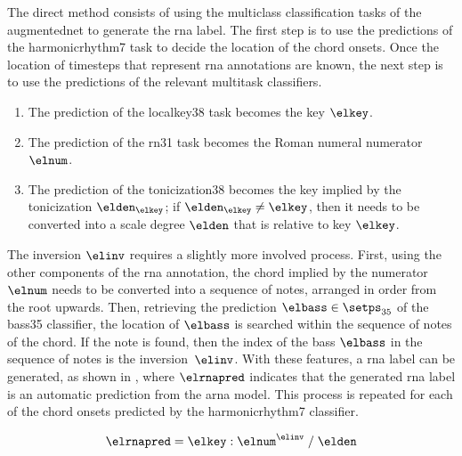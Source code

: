 

The direct method consists of using the multiclass
classification tasks of the \gls{augmentednet} to generate
the \gls{rna} label. The first step is to use the
predictions of the \gls{harmonicrhythm7} task to decide the
location of the chord onsets. Once the location of timesteps
that represent \gls{rna} annotations are known, the next
step is to use the predictions of the relevant multitask
classifiers.

\begin{enumerate}
    \item[] The prediction of the \gls{localkey38} task
    becomes the key $\elkey$.
    \item[] The prediction of the \gls{rn31} task becomes
    the Roman numeral numerator $\elnum$.
    \item[] The prediction of the \gls{tonicization38}
    becomes the key implied by the tonicization
    $\elden_\elkey$; if $\elden_\elkey \neq \elkey$, then it
    needs to be converted into a scale degree $\elden$ that
    is relative to key $\elkey$.
\end{enumerate}

The inversion $\elinv$ requires a slightly more involved
process. First, using the other components of the \gls{rna}
annotation, the chord implied by the numerator $\elnum$
needs to be converted into a sequence of notes, arranged in
order from the root upwards. Then, retrieving the prediction
$\elbass \in \setps_{35}$ of the \gls{bass35} classifier,
the location of $\elbass$ is searched within the sequence of
notes of the chord. If the note is found, then the index of
the bass $\elbass$ in the sequence of notes is the
inversion~$\elinv$. With these features, a \gls{rna} label
can be generated, as shown in , where
$\elrnapred$ indicates that the generated \gls{rna} label is
an automatic prediction from the \gls{arna} model. This
process is repeated for each of the chord onsets predicted
by the \gls{harmonicrhythm7} classifier.

\begin{equation}
    \label{eq:rna_direct}
    \elrnapred = \elkey : \elnum^{\elinv} \; / \; \elden
\end{equation}



